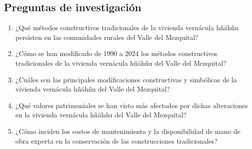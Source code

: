 \subsection{Preguntas de investigación}

\begin{enumerate}

	\item {¿Qué métodos constructivos tradicionales de la vivienda vernácula hñähñu persisten en las comunidades rurales del Valle del Mezquital?}

	\item {¿Cómo se han modificado de 1990 a 2024 los métodos constructivos tradicionales de la vivienda vernácula hñähñu del Valle del Mezquital?}

	\item {¿Cuáles son las principales modificaciones constructivas y simbólicas de la vivienda vernácula hñähñu del Valle del Mezquital?}

	\item {¿Qué valores patrimoniales se han visto más afectados por dichas alteraciones en la vivienda vernácula hñähñu del Valle del Mezquital?}

	\item {¿Cómo inciden los costos de mantenimiento y la disponibilidad de mano de obra experta en la conservación de las construcciones tradicionales?}



\end{enumerate}
